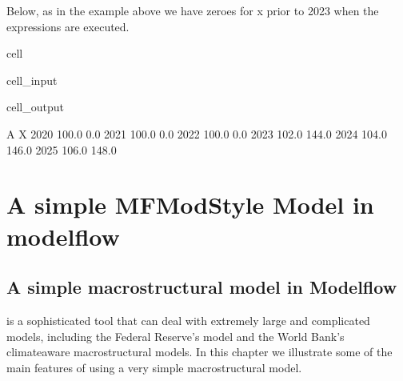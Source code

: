 \documentclass[letterpaper,10pt,english]{jupyterBook}
\begin{document}
\sphinxAtStartPar
Below, as in the example above we have zeroes for x prior to 2023 when the expressions are executed.

\begin{sphinxuseclass}{cell}\begin{sphinxVerbatimInput}

\begin{sphinxuseclass}{cell_input}
\begin{sphinxVerbatim}[commandchars=\\\{\}]
  


\end{sphinxVerbatim}

\end{sphinxuseclass}\end{sphinxVerbatimInput}
\begin{sphinxVerbatimOutput}

\begin{sphinxuseclass}{cell_output}
\begin{sphinxVerbatim}[commandchars=\\\{\}]
          A      X
2020  100.0    0.0
2021  100.0    0.0
2022  100.0    0.0
2023  102.0  144.0
2024  104.0  146.0
2025  106.0  148.0
\end{sphinxVerbatim}

\end{sphinxuseclass}\end{sphinxVerbatimOutput}

\end{sphinxuseclass}
\sphinxstepscope


\part{A simple MFMod\sphinxhyphen{}Style Model in modelflow}

\sphinxstepscope


\chapter{A simple macrostructural model in Modelflow}
\label{\detokenize{content/05_SimpleModel/SimpleModel:a-simple-macrostructural-model-in-modelflow}}\label{\detokenize{content/05_SimpleModel/SimpleModel::doc}}
\sphinxAtStartPar
{} is a sophisticated tool that can deal with extremely large and complicated models, including the Federal Reserve’s  model and the World Bank’s climate\sphinxhyphen{}aware macrostructural models.  In this chapter we illustrate some of the main features of  using a very simple macrostructural model.
\end{document}
